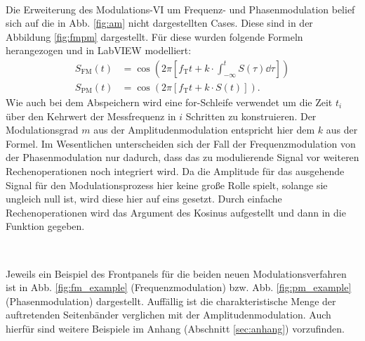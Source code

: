 \

Die Erweiterung des Modulations-VI um Frequenz- und Phasenmodulation belief sich auf die in Abb. \ref{fig:am} nicht dargestellten Cases.
Diese sind in der Abbildung \ref{fig:fmpm} dargestellt.
Für diese wurden folgende Formeln herangezogen und in LabVIEW modelliert:
\begin{align}
	\label{eq:FM} S_\text{FM}(t) &= \cos{(2\pi[f_\text{T}t + k \cdot \int_{-\infty}^{t}{S(\tau)\dd{\tau}}])} \\
	\label{eq:PM} S_\text{PM}(t) &= \cos{(2\pi[f_\text{T}t + k \cdot S(t)])}.
\end{align} 
Wie auch bei dem Abspeichern wird eine for-Schleife verwendet um die Zeit $t_i$ über den Kehrwert der Messfrequenz in $i$ Schritten zu konstruieren.
Der Modulationsgrad $m$ aus der Amplitudenmodulation entspricht hier dem $k$ aus der Formel.
Im Wesentlichen unterscheiden sich der Fall der Frequenzmodulation von der Phasenmodulation nur dadurch, dass das zu modulierende Signal vor weiteren Rechenoperationen noch integriert wird.
Da die Amplitude für das ausgehende Signal für den Modulationsprozess hier keine große Rolle spielt, solange sie ungleich null ist, wird diese hier auf eins gesetzt.
Durch einfache Rechenoperationen wird das Argument des Kosinus aufgestellt und dann in die Funktion gegeben.
		
\
	
Jeweils ein Beispiel des Frontpanels für die beiden neuen Modulationsverfahren ist in Abb. \ref{fig:fm_example} (Frequenzmodulation) bzw. Abb. \ref{fig:pm_example} (Phasenmodulation) dargestellt.
Auffällig ist die charakteristische Menge der auftretenden Seitenbänder verglichen mit der Amplitudenmodulation.
Auch hierfür sind weitere Beispiele im Anhang (Abschnitt \ref{sec:anhang}) vorzufinden.

